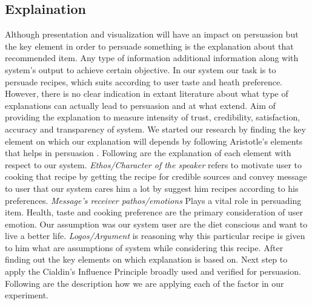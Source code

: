 \subsection{Explaination}

Although presentation and visualization will have an impact on persuasion but the key element in order to persuade something is the explanation about that recommended item. Any type of information additional information along with system’s output to achieve certain objective.  In our system our task is to persuade recipes, which suits according to user taste and heath preference. However, there is no clear indication in extant literature about what type of explanations can actually lead to persuasion and at what extend. Aim of providing the explanation to measure intensity of trust, credibility, satisfaction, accuracy and transparency of system. We started our research by finding the key element on which our explanation will depends by following Aristotle’s elements that helps in persuasion \cite{gkika2014persuasive}. Following are the explanation of each element with respect to our system. \textit{Ethos/Character of the speaker} refers to motivate user to cooking that recipe by getting the recipe for credible sources and convey message to user that our system cares him a lot by suggest him recipes according to his preferences. \textit{Message’s receiver pathos/emotions} Plays a vital role in persuading item. Health, taste and cooking preference are the primary consideration of user emotion. Our assumption was our system user are the diet conscious and want to live a better life. \textit{Logos/Argument} is reasoning why this particular recipe is given to him what are assumptions of system while considering this recipe. After finding out the key elements on which explanation is based on. Next step to apply the Cialdin’s Influence Principle\cite{cialdini2009influence} broadly used and verified for persuasion. Following are the description how we are applying each of the factor in our experiment.
  
